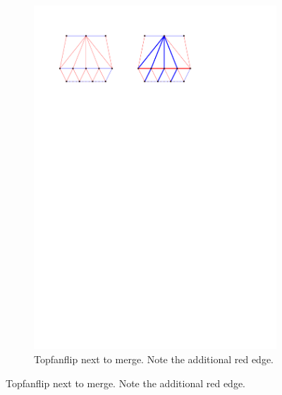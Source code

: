 \begin{figure}
\begin{subfigure}[b]{0.45 \textwidth}
    \end{subfigure}
    ~
    \begin{subfigure}[b]{0.45 \textwidth}
        \includegraphics[width =\textwidth]{topFanFlips/img/mergeend}
        \caption{Topfanflip next to merge. Note the additional red edge.}
        \label{fig:fanflip:mergeLastVertex}


\end{subfigure}
\end{figure}
